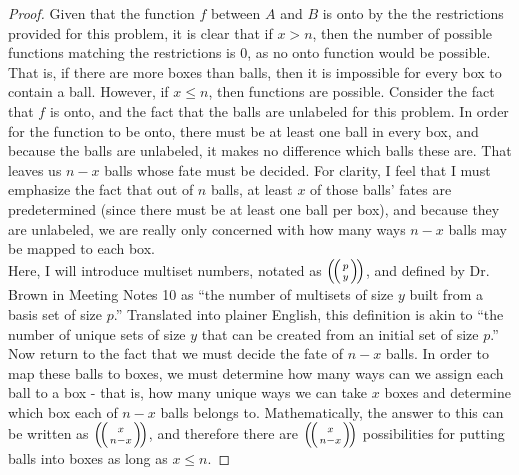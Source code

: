 \documentclass[12pt]{article}
\newenvironment{problem}[2][Problem]{\begin{trivlist}
\item[\hskip \labelsep {\bfseries #1}\hskip \labelsep {\bfseries #2.}]}{\end{trivlist}}
\begin{document}
\newpage
\begin{problem}{6}
\end{problem}
\begin{proof}
Given that the function $f$ between $A$ and $B$ is onto by the the restrictions provided for this problem, it is clear that if $x > n$, then the number of possible functions matching the restrictions is 0, as no onto function would be possible. That is, if there are more boxes than balls, then it is impossible for every box to contain a ball. However, if $x \leq n$, then functions are possible. Consider the fact that $f$ is onto, and the fact that the balls are unlabeled for this problem. In order for the function to be onto, there must be at least one ball in every box, and because the balls are unlabeled, it makes no difference which balls these are. That leaves us $n-x$ balls whose fate must be decided. For clarity, I feel that I must emphasize the fact that out of $n$ balls, at least $x$ of those balls' fates are predetermined (since there must be at least one ball per box), and because they are unlabeled, we are really only concerned with how many ways $n-x$ balls may be mapped to each box. \\ 
\indent Here, I will introduce multiset numbers, notated as $\left(\!\left(p \atop y \right)\!\right)$, and defined by Dr. Brown in Meeting Notes 10 as ``the number of multisets of size $y$ built from a basis set of size $p$.'' Translated into plainer English, this definition is akin to ``the number of unique sets of size $y$ that can be created from an initial set of size $p$.'' Now return to the fact that we must decide the fate of $n-x$ balls. In order to map these balls to boxes, we must determine how many ways can we assign each ball to a box - that is, how many unique ways we can take $x$ boxes and determine which box each of $n-x$ balls belongs to. Mathematically, the answer to this can be written as $\left(\!\left(x \atop n-x \right)\!\right)$, and therefore there are $\left(\!\left(x \atop n-x \right)\!\right)$ possibilities for putting balls into boxes as long as $x \leq n$.
\end{proof}
\end{document}
